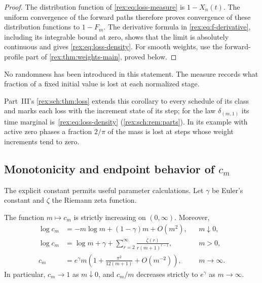 \begin{proof}
The distribution function of \cref{rex:eq:loss-measure} is $1-X_n(t)$.
The uniform convergence of the forward paths therefore proves
convergence of these distribution functions to $1-F_m$. The
derivative formula in \cref{rex:eq:f-derivative}, including its integrable
bound at zero, shows that the limit is absolutely continuous and gives
\cref{rex:eq:loss-density}. For smooth weights, use the forward-profile
part of \cref{rex:thm:weights-main}, proved below.
\end{proof}

No randomness has been introduced in this statement. The measure records
what fraction of a fixed initial value is lost at each normalized stage.

\begin{writenote}
Part~III's \cref{rex:sch:thm:loss} extends this corollary to every schedule
of its class and marks each loss with the increment state of its step; for
the law $\delta_{(m,1)}$ its time marginal is~\eqref{rex:eq:loss-density}
(\cref{rex:sch:rem:parts}). In its example with active zero phases a
fraction $2/\pi$ of the mass is lost at steps whose weight increments tend
to zero.
\end{writenote}

\subsection{Monotonicity and endpoint behavior of \texorpdfstring{$c_m$}{c(m)}}

The explicit constant permits useful parameter calculations. Let
$\gamma$ be Euler's constant and $\zeta$ the Riemann zeta function.

\begin{proposition}[Dependence on $m$]\label{rex:prop:parameter}
The function $m\mapsto c_m$ is strictly increasing on $(0,\infty)$.
Moreover,
\begin{align}
 \log c_m
 &=-m\log m+(1-\gamma)m+O(m^2),
        &&m\downarrow0,\label{rex:eq:small-m}\\
 \log c_m
 &=\log m+\gamma+
   \sum_{r=2}^{\infty}\frac{\zeta(r)}{r(m+1)^{r-1}},
        &&m>0,\label{rex:eq:large-m-series}\\
 c_m
 &=e^\gamma m\left(1+\frac{\pi^2}{12(m+1)}+O(m^{-2})\right),
        &&m\to\infty.\label{rex:eq:large-m}
\end{align}
In particular, $c_m\to1$ as $m\downarrow0$, and $c_m/m$ decreases
strictly to $e^\gamma$ as $m\to\infty$.
\end{proposition}


